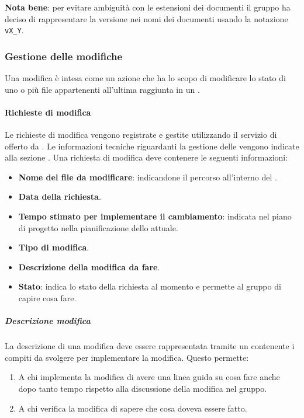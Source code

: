 \textbf{Nota bene}: per evitare ambiguità con le estensioni dei documenti il gruppo ha deciso di rappresentare la versione nei nomi dei documenti usando la notazione \texttt{vX\_Y}.

\subsubsection{Gestione delle modifiche}
Una modifica è intesa come un azione che ha lo scopo di modificare lo stato di uno o più file appartenenti all'ultima  raggiunta in un . 

\paragraph{Richieste di modifica}
Le richieste di modifica vengono registrate e gestite utilizzando il servizio di  offerto da .  
Le informazioni tecniche riguardanti la gestione delle  vengono indicate alla sezione \hyperref[subpar:ITS]{}.
Una richiesta di modifica deve contenere le seguenti informazioni:
\begin{itemize}
    \item \textbf{Nome del file da modificare}: indicandone il percorso all'interno del .
    \item \textbf{Data della richiesta}.
    \item \textbf{Tempo stimato per implementare il cambiamento}: indicata nel piano di progetto nella pianificazione dello  attuale.
    \item \textbf{Tipo di modifica}.
    \item \textbf{Descrizione della modifica da fare}.
    \item \textbf{Stato}: indica lo stato della richiesta al momento e permette al gruppo di capire cosa fare.
\end{itemize}

\subparagraph{Descrizione modifica}
La descrizione di una modifica deve essere rappresentata tramite un  contenente i compiti da svolgere per implementare la modifica.
Questo permette:
\begin{enumerate}
    \item [a.] A chi implementa la modifica di avere una linea guida su cosa fare anche dopo tanto tempo rispetto alla discussione della modifica nel gruppo.
    \item [b.] A chi verifica la modifica di sapere che cosa doveva essere fatto.
\end{enumerate} 

